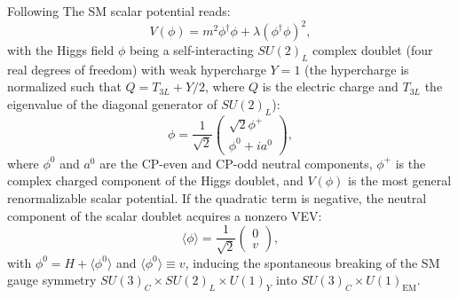 Following The SM scalar potential reads:
\begin{equation}
    V (\phi) = m^2\phi^\dagger\phi + \lambda(\phi^\dagger\phi)^2,
\end{equation}
with the Higgs field $\phi$ being a self-interacting $SU(2)_L$ complex doublet (four real degrees of freedom) with weak hypercharge $Y = 1$ (the hypercharge is normalized such that $Q = T_{3L} + Y /2$, where $Q$ is the electric charge and $T_{3L}$ the eigenvalue of the diagonal generator of $SU(2)_L$):
\begin{equation}
    \phi = \frac{1}{\sqrt{2}}
    \begin{pmatrix}
        \sqrt{2}\phi^+ \\
        \phi^0 + ia^0
    \end{pmatrix},
\end{equation}
where $\phi^0$ and $a^0$ are the CP-even and CP-odd neutral components, $\phi^+$ is the complex charged component of the Higgs doublet, and $V(\phi)$ is the most general renormalizable scalar potential.
If the quadratic term is negative, the neutral component of the scalar doublet acquires a nonzero VEV:
\begin{equation}
    \langle\phi\rangle = \frac{1}{\sqrt{2}}
    \begin{pmatrix}
        0 \\ v
    \end{pmatrix},
\end{equation}
with $\phi^0 = H+\langle\phi^0\rangle$ and $\langle\phi^0\rangle \equiv v$, inducing the spontaneous breaking of the SM gauge symmetry $SU(3)_C \times SU(2)_L \times U(1)_Y$ into $SU(3)_C \times U(1)_\text{EM}$.

